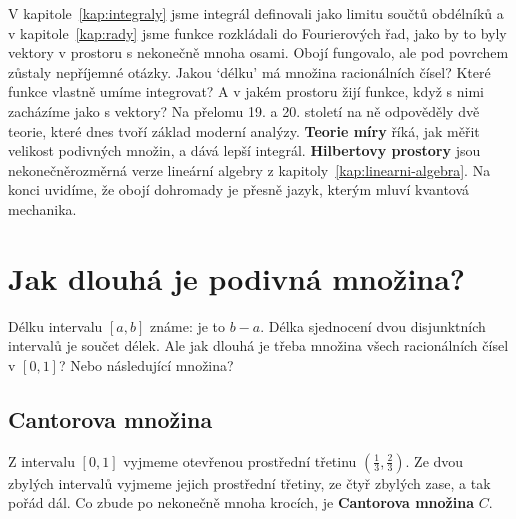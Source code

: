 \label{kap:hilbert}

V kapitole~\ref{kap:integraly} jsme integrál definovali jako limitu součtů obdélníků a v kapitole~\ref{kap:rady} jsme funkce rozkládali do Fourierových řad, jako by to byly vektory v prostoru s nekonečně mnoha osami. Obojí fungovalo, ale pod povrchem zůstaly nepříjemné otázky. Jakou `délku' má množina racionálních čísel? Které funkce vlastně umíme integrovat? A v jakém prostoru žijí funkce, když s nimi zacházíme jako s vektory? Na přelomu 19. a 20. století na ně odpověděly dvě teorie, které dnes tvoří základ moderní analýzy. \textbf{Teorie míry} říká, jak měřit velikost podivných množin, a dává lepší integrál. \textbf{Hilbertovy prostory} jsou nekonečněrozměrná verze lineární algebry z kapitoly~\ref{kap:linearni-algebra}. Na konci uvidíme, že obojí dohromady je přesně jazyk, kterým mluví kvantová mechanika.

\section{Jak dlouhá je podivná množina?}

Délku intervalu $[a, b]$ známe: je to $b - a$. Délka sjednocení dvou disjunktních intervalů je součet délek. Ale jak dlouhá je třeba množina všech racionálních čísel v $[0, 1]$? Nebo následující množina?

\subsection{Cantorova množina}

Z intervalu $[0, 1]$ vyjmeme otevřenou prostřední třetinu $(\frac{1}{3}, \frac{2}{3})$. Ze dvou zbylých intervalů vyjmeme jejich prostřední třetiny, ze čtyř zbylých zase, a tak pořád dál. Co zbude po nekonečně mnoha krocích, je \textbf{Cantorova množina} $C$.

